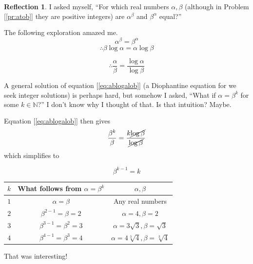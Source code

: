\documentclass[english,notitlepage,smartquotes]{hgbreport}
\theoremstyle{definition}
\theoremstyle{definition}
\theoremstyle{remark}
\theoremstyle{definition}
\theoremstyle{plain}
\theoremstyle{definition}
\newtheorem{reflection}{Reflection}
\begin{document}
\begin{reflection}

I asked myself, ``For which real numbers $\alpha,\beta$ (although in Problem [\ref{pr:atob}] they are positive integers) are $\alpha^\beta$ and $\beta^\alpha$ equal?''

The following exploration amazed me.
$$
\alpha^\beta=\beta^\alpha
$$
\begin{equation}
\label{eq:takelogs}
\therefore \beta\log\alpha=\alpha\log\beta
\end{equation}

\begin{equation}
\label{eq:ablogalob}
\therefore \frac{\alpha}{\beta}=\frac{\log\alpha}{\log\beta}
\end{equation}

A general solution of equation [\ref{eq:ablogalob}] (a Diophantine equation for we seek integer solutions) is perhaps hard, but somehow I asked, ``What if $\alpha=\beta^k$ for some $k\in\mathbb N$?'' I don't know why I thought of that. Is that intuition? Maybe.

Equation [\ref{eq:ablogalob}] then gives
$$
\frac{\beta^k}{\beta}=\frac{k\cancel{\log\beta}}{\cancel{\log\beta}}
$$
which simplifies to

\begin{equation}
\label{eq:bk-1k}
\beta^{k-1}=k
\end{equation}


\begin{tabular}{|c|c|c|}
 \hline
 $k$ & What follows from $\alpha=\beta^k$ & $\alpha,\beta$ \\ \hline
 \hline
 $1$ & $\alpha=\beta$  & Any real numbers \\ \hline
 $2$ & $\beta^{2-1}=\beta=2$ & $\alpha=4,\beta=2$ \\ \hline
 $3$ & $\beta^{3-1}=\beta^2=3$ & $\alpha=3\sqrt{3},\beta=\sqrt{3}$ \\ \hline
 $4$ & $\beta^{4-1}=\beta^3=4$ & $\alpha=4\sqrt[3]{4},\beta=\sqrt[3]{4}$ \\ \hline
\end{tabular}


That was interesting! 

\end{reflection}
\end{document}
